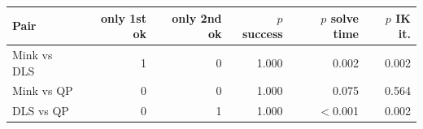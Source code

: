 \begin{tabular}{lrrrrr}
\toprule
Pair & only 1st ok & only 2nd ok & $p$ success & $p$ solve time & $p$ IK it.\\
\midrule
Mink vs DLS & 1 & 0 & 1.000 & 0.002 & 0.002\\
Mink vs QP & 0 & 0 & 1.000 & 0.075 & 0.564\\
DLS vs QP & 0 & 1 & 1.000 & $<$0.001 & 0.002\\
\bottomrule
\end{tabular}
